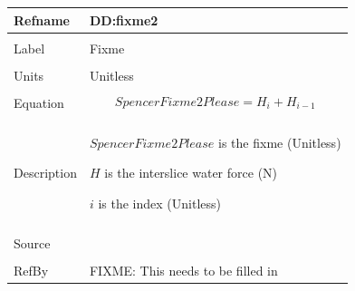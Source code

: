 \documentclass[12pt]{article}
\begin{document}
\noindent \begin{minipage}{\textwidth}
\begin{tabular}{p{} p{}}
\toprule \textbf{Refname} & \textbf{DD:fixme2}
\label{DD:fixme2}
\\ \midrule \\
Label & Fixme
\\ \midrule \\
Units & Unitless
\\ \midrule \\
Equation & \begin{dmath}
           SpencerFixme2Please=H_{i}+H_{i-1}
           \end{dmath}
\\ \midrule \\
Description & \begin{symbDescription}
              \item{$SpencerFixme2Please$ is the fixme (Unitless)}
              \item{$H$ is the interslice water force (N)}
              \item{$i$ is the index (Unitless)}
              \end{symbDescription}
\\ \midrule \\
Source &
\\ \midrule \\
RefBy & FIXME: This needs to be filled in
\\ \bottomrule \end{tabular}
\end{minipage}\\
\end{document}
